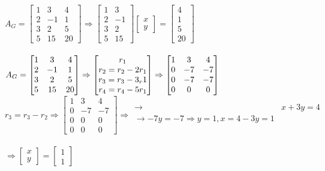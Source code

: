\documentclass [12pt]{article}
\begin{document}
$A_G=\begin{bmatrix}
1&3&4\\
2&-1&1\\
3&2&5\\
5&15&20
\end{bmatrix} \Rightarrow \begin{bmatrix}
1&3\\
2&-1\\
3&2\\
5&15
\end{bmatrix}\begin{bmatrix}
x\\
y
\end{bmatrix}=\begin{bmatrix}
4\\
1\\
5\\
20
\end{bmatrix}$\\\\
$A_G=\begin{bmatrix}
1&3&4\\
2&-1&1\\
3&2&5\\
5&15&20
\end{bmatrix}\Rightarrow\begin{bmatrix}
r_1\\
r_2=r_2-2r_1\\
r_3=r_3-3_r1\\
r_4=r_4-5r_1
\end{bmatrix} \Rightarrow \begin{bmatrix}
1&3&4\\
0&-7&-7\\
0&-7&-7\\
0&0&0
\end{bmatrix}\indent$\\ $r_3=r_3-r_2\Rightarrow\begin{bmatrix}
1&3&4\\
0&-7&-7\\
0&0&0\\
0&0&0
\end{bmatrix}\Rightarrow\begin{matrix}
\rightarrow&x+3y=4\\
\rightarrow-7y=-7\Rightarrow y=1, x=4-3y=1\\
\end{matrix}$ \\\\
$\Rightarrow\begin{bmatrix}
x\\
y
\end{bmatrix}=\begin{bmatrix}
1\\
1
\end{bmatrix}$\\\\
\end{document}
